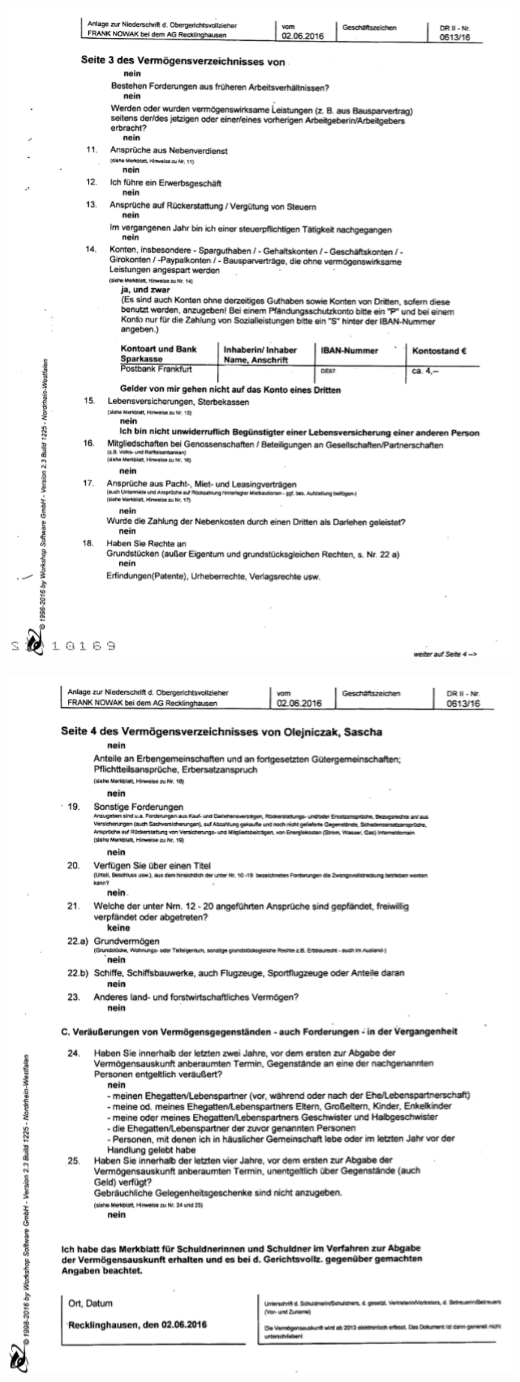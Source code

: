 \bigskip\noindent
\begin{minipage}{\textwidth}
  \centering
  \includegraphics{img/VVformular_teil3.PNG}
\end{minipage}

\bigskip\noindent
\begin{minipage}{\textwidth}
  \centering
  \includegraphics{img/VVformular_teil4.PNG}
\end{minipage}